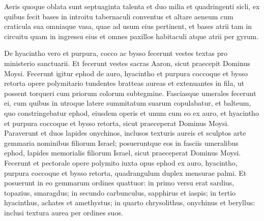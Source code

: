 \begin{biblechapter}
\begin{biblechapter}
\begin{biblechapter}
\begin{biblechapter}
\begin{biblechapter}
\begin{biblechapter}
\begin{biblechapter}
\begin{biblechapter}
\begin{biblechapter}
\begin{biblechapter}
\begin{biblechapter}
\begin{biblechapter}
\begin{biblechapter}
\begin{biblechapter}
\begin{biblechapter}
\begin{biblechapter}
\begin{biblechapter}
\begin{biblechapter}
\begin{biblechapter}
\begin{biblechapter}
\begin{biblechapter}
\begin{biblechapter}
\begin{biblechapter}
\begin{biblechapter}
\begin{biblechapter}
\begin{biblechapter}
\begin{biblechapter}
\begin{biblechapter}
\begin{biblechapter}
\begin{biblechapter}
\begin{biblechapter}
\begin{biblechapter}
\begin{biblechapter}
\begin{biblechapter}
\begin{biblechapter}
\begin{biblechapter}
\begin{biblechapter}
\begin{biblechapter}
\verse Aeris quoque oblata sunt septuaginta talenta et duo milia et quadringenti sicli, 
\verse ex quibus fecit bases in introitu tabernaculi conventus et altare aeneum cum craticula sua omniaque vasa, quae ad usum eius pertinent, 
\verse et bases atrii tam in circuitu quam in ingressu eius et omnes paxillos habitaculi atque atrii per gyrum.
 
\begin{biblechapter}
\verse De hyacintho vero et purpura, cocco ac bysso fecerunt vestes textas pro ministerio sanctuarii. Et fecerunt vestes sacras Aaron, sicut praecepit Dominus Moysi.
 \verse Fecerunt igitur ephod de auro, hyacintho et purpura coccoque et bysso retorta 
\verse opere polymitario tundentes bratteas aureas et extenuantes in fila, ut possent torqueri cum priorum colorum subtegmine. 
\verse Fasciasque umerales fecerunt ei, cum quibus in utroque latere summitatum suarum copulabatur, 
\verse et balteum, quo constringebatur ephod, eiusdem operis et unum cum eo ex auro, et hyacintho et purpura coccoque et bysso retorta, sicut praeceperat Dominus Moysi. 
 \verse Paraverunt et duos lapides onychinos, inclusos texturis aureis et sculptos arte gemmaria nominibus filiorum Israel; 
\verse posueruntque eos in fasciis umeralibus ephod, lapides memorialis filiorum Israel, sicut praeceperat Dominus Moysi.
 \verse Fecerunt et pectorale opere polymito iuxta opus ephod ex auro, hyacintho, purpura coccoque et bysso retorta, 
\verse quadrangulum duplex mensurae palmi. 
 \verse Et posuerunt in eo gemmarum ordines quattuor: in primo versu erat sardius, topazius, smaragdus; 
\verse in secundo carbunculus, sapphirus et iaspis; 
\verse in tertio hyacinthus, achates et amethystus; 
\verse in quarto chrysolithus, onychinus et beryllus: inclusi textura aurea per ordines suos. 

\end{biblechapter}
\end{biblechapter}
\end{biblechapter}
\end{biblechapter}
\end{biblechapter}
\end{biblechapter}
\end{biblechapter}
\end{biblechapter}
\end{biblechapter}
\end{biblechapter}
\end{biblechapter}
\end{biblechapter}
\end{biblechapter}
\end{biblechapter}
\end{biblechapter}
\end{biblechapter}
\end{biblechapter}
\end{biblechapter}
\end{biblechapter}
\end{biblechapter}
\end{biblechapter}
\end{biblechapter}
\end{biblechapter}
\end{biblechapter}
\end{biblechapter}
\end{biblechapter}
\end{biblechapter}
\end{biblechapter}
\end{biblechapter}
\end{biblechapter}
\end{biblechapter}
\end{biblechapter}
\end{biblechapter}
\end{biblechapter}
\end{biblechapter}
\end{biblechapter}
\end{biblechapter}
\end{biblechapter}
\end{biblechapter}
